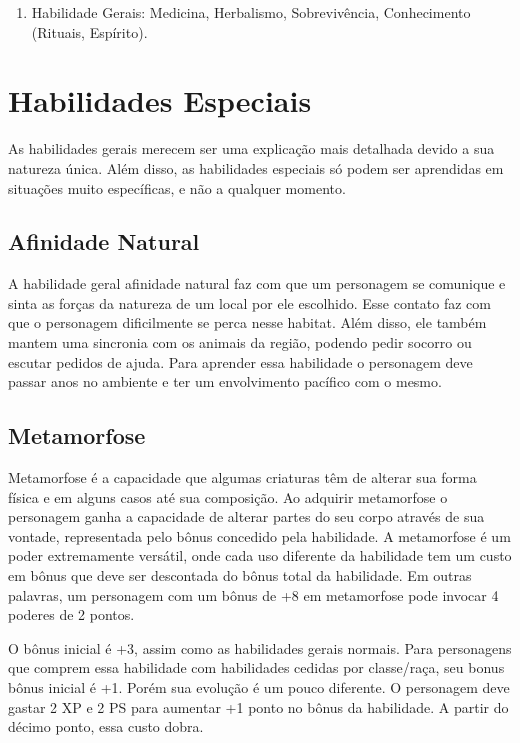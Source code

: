 \begin{enumerate}


\item Habilidade Gerais: Medicina, Herbalismo, Sobrevivência, Conhecimento (Rituais, Espírito).


\end{enumerate}

\section{Habilidades Especiais}

As habilidades gerais merecem ser uma explicação mais detalhada devido a sua natureza única. Além disso, as habilidades especiais só podem ser aprendidas em situações muito específicas, e não a qualquer momento.

\subsection{Afinidade Natural}
 A habilidade geral afinidade natural faz com que um personagem se comunique e sinta as forças da natureza de um local por ele escolhido. Esse contato faz com que o personagem dificilmente se perca nesse habitat. Além disso, ele também mantem uma sincronia com os animais da região, podendo pedir socorro ou escutar pedidos de ajuda. Para aprender essa habilidade o personagem deve passar anos no ambiente e ter um envolvimento pacífico com o mesmo.
 
 
 \subsection{Metamorfose}
 
 Metamorfose é a capacidade que algumas criaturas têm de alterar sua forma física e em alguns casos até sua composição. Ao adquirir metamorfose o personagem ganha a capacidade de alterar partes do seu corpo através de sua vontade, representada pelo bônus concedido pela habilidade. A metamorfose é um poder extremamente versátil, onde cada uso diferente da habilidade tem um custo em bônus que deve ser descontada do bônus total da habilidade. Em outras palavras, um personagem com um bônus de +8 em metamorfose pode invocar 4 poderes de 2 pontos. 

O bônus inicial é +3, assim como as habilidades gerais normais. Para personagens que comprem essa habilidade com habilidades cedidas por classe/raça, seu bonus bônus inicial é +1. Porém sua evolução é um pouco diferente. O personagem deve gastar 2 XP e 2 PS para aumentar +1 ponto no bônus da habilidade. A partir do décimo ponto, essa custo dobra.

